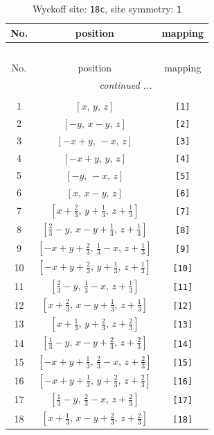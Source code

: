 \documentclass[fleqn,8pt]{jsarticle}
\begin{document}
\begin{longtable}{ccc}
\caption{Wyckoff site: {\tt 18c}, site symmetry: {\tt 1}}
 \\
 \hline \hline
No. & position & mapping \\ \hline \endfirsthead

\multicolumn{2}{l}{\tablename\ \thetable{}} \\
 \hline \hline
No. & position & mapping \\ \hline \endhead

 \hline \hline
\multicolumn{2}{r}{\footnotesize\it continued ...} \\ \endfoot

 \hline \hline
\multicolumn{2}{r}{} \\ \endlastfoot

1 & $\left[ x,\, y,\, z \right]$ & {\tt [1]} \\ \hline
2 & $\left[ - y,\, x - y,\, z \right]$ & {\tt [2]} \\ \hline
3 & $\left[ - x + y,\, - x,\, z \right]$ & {\tt [3]} \\ \hline
4 & $\left[ - x + y,\, y,\, z \right]$ & {\tt [4]} \\ \hline
5 & $\left[ - y,\, - x,\, z \right]$ & {\tt [5]} \\ \hline
6 & $\left[ x,\, x - y,\, z \right]$ & {\tt [6]} \\ \hline
7 & $\left[ x + \frac{2}{3},\, y + \frac{1}{3},\, z + \frac{1}{3} \right]$ & {\tt [7]} \\ \hline
8 & $\left[ \frac{2}{3} - y,\, x - y + \frac{1}{3},\, z + \frac{1}{3} \right]$ & {\tt [8]} \\ \hline
9 & $\left[ - x + y + \frac{2}{3},\, \frac{1}{3} - x,\, z + \frac{1}{3} \right]$ & {\tt [9]} \\ \hline
10 & $\left[ - x + y + \frac{2}{3},\, y + \frac{1}{3},\, z + \frac{1}{3} \right]$ & {\tt [10]} \\ \hline
11 & $\left[ \frac{2}{3} - y,\, \frac{1}{3} - x,\, z + \frac{1}{3} \right]$ & {\tt [11]} \\ \hline
12 & $\left[ x + \frac{2}{3},\, x - y + \frac{1}{3},\, z + \frac{1}{3} \right]$ & {\tt [12]} \\ \hline
13 & $\left[ x + \frac{1}{3},\, y + \frac{2}{3},\, z + \frac{2}{3} \right]$ & {\tt [13]} \\ \hline
14 & $\left[ \frac{1}{3} - y,\, x - y + \frac{2}{3},\, z + \frac{2}{3} \right]$ & {\tt [14]} \\ \hline
15 & $\left[ - x + y + \frac{1}{3},\, \frac{2}{3} - x,\, z + \frac{2}{3} \right]$ & {\tt [15]} \\ \hline
16 & $\left[ - x + y + \frac{1}{3},\, y + \frac{2}{3},\, z + \frac{2}{3} \right]$ & {\tt [16]} \\ \hline
17 & $\left[ \frac{1}{3} - y,\, \frac{2}{3} - x,\, z + \frac{2}{3} \right]$ & {\tt [17]} \\ \hline
18 & $\left[ x + \frac{1}{3},\, x - y + \frac{2}{3},\, z + \frac{2}{3} \right]$ & {\tt [18]} \\
\end{longtable}
\end{document}
